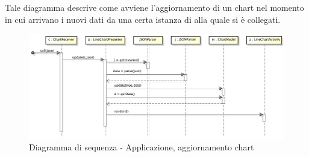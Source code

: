             
            Tale diagramma descrive come avviene l'aggiornamento di un chart nel momento in cui arrivano i nuovi dati da una certa istanza di  alla quale si è collegati.
            \begin{figure}[H]
                \centering
                \includegraphics[scale=0.3]{DefinizioneDiProdotto/Pics/ApplicazioneAggiornamentoChart}
                \caption{Diagramma di sequenza - Applicazione, aggiornamento chart}
            \end{figure}
